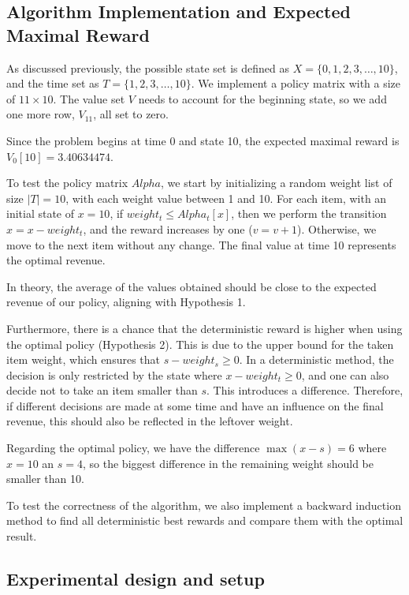 \subsection{Algorithm Implementation and Expected Maximal Reward}
\label{sec:alg}

As discussed previously, the possible state set is defined as $X = \{0,1,2,3,\ldots,10\}$, and the time set as $T = \{1,2,3,\ldots,10\}$. We implement a policy matrix with a size of $11 \times 10$. The value set $V$ needs to account for the beginning state, so we add one more row, $V_{11}$, all set to zero.

Since the problem begins at time 0 and state 10, the expected maximal reward is $V_0[10] = 3.40634474$.

To test the policy matrix $Alpha$, we start by initializing a random weight list of size $|T| = 10$, with each weight value between 1 and 10. For each item, with an initial state of $x=10$, if $weight_t \leq Alpha_t[x]$, then we perform the transition $x=x-weight_t$, and the reward increases by one ($v=v+1$). Otherwise, we move to the next item without any change. The final value at time 10 represents the optimal revenue.

In theory, the average of the values obtained should be close to the expected revenue of our policy, aligning with Hypothesis 1.

Furthermore, there is a chance that the deterministic reward is higher when using the optimal policy (Hypothesis 2). This is due to the upper bound for the taken item weight, which ensures that $s - weight_s \geq 0$. In a deterministic method, the decision is only restricted by the state where $x - weight_t \geq 0$, and one can also decide not to take an item smaller than $s$. This introduces a difference. Therefore, if different decisions are made at some time and have an influence on the final revenue, this should also be reflected in the leftover weight.

Regarding the optimal policy, we have the difference $\max(x-s) = 6$ where $x = 10$ an $s = 4$, so the biggest difference in the remaining weight should be smaller than 10.

To test the correctness of the algorithm, we also implement a backward induction method to find all deterministic best rewards and compare them with the optimal result.

\subsection{Experimental design and setup}

